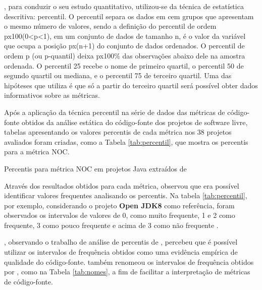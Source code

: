 , para conduzir o seu estudo quantitativo, utilizou-se da técnica de estatística descritiva: percentil. O percentil separa os dados em cem grupos que apresentam o mesmo número de valores, sendo a definição do percentil de ordem px100(0<p<1), em um conjunto de dados de tamanho n, é o valor da variável que ocupa a posição px(n+1) do conjunto de dados ordenados. O percentil de ordem p (ou p-quantil) deixa px100\% das observações abaixo dele na amostra ordenada. O percentil 25 recebe o nome de primeiro quartil, o percentil 50 de segundo quartil ou mediana, e o percentil 75 de terceiro quartil. Uma das hipóteses que  utiliza é que só a partir do terceiro quartil será possível obter dados informativos sobre as métricas.

Após a aplicação da técnica percentil na série de dados das métricas de código-fonte obtidos da análise estática do código-fonte dos projetos de software livre, tabelas apresentando os valores percentis de cada métrica nos 38 projetos avaliados foram criadas, como a Tabela \ref{tab:percentil}, que mostra os percentis para a métrica NOC.  
	
	\begin{table}[!ht]
	\begin{center}
	
	 
	\caption{Percentis para métrica NOC em projetos Java extraídos de  
	}
	\label{tab:percentil}
	\end{center}
	\end{table}	
	\FloatBarrier	

Através dos resultados obtidos para cada métrica,  observou que era possível identificar valores frequentes analisando os percentis. Na tabela \ref{tab:percentil}, por exemplo, considerando o projeto \textbf{Open JDK8} como referência, foram observados os intervalos de valores de 0, como muito frequente, 1 e 2 como frequente, 3 como pouco frequente e acima de 3 como não frequente \cite{Meirelles2013}. 

, observando o trabalho de análise de percentis de , percebeu que é possível utilizar os intervalos de frequência obtidos como uma evidência empírica de qualidade do código-fonte.  também renomeou os intervalos de frequência obtidos por , como na Tabela \ref{tab:nomes}, a fim de facilitar a interpretação de métricas de código-fonte. 

